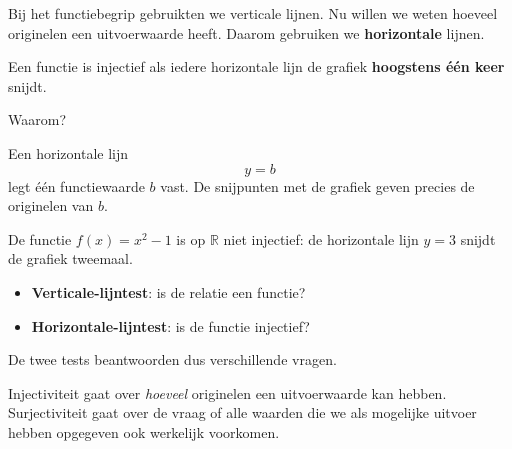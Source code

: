 \documentclass{ximera}
\begin{document}

Bij het functiebegrip gebruikten we verticale lijnen. Nu willen we weten
hoeveel originelen een uitvoerwaarde heeft. Daarom gebruiken we
\textbf{horizontale} lijnen.

\begin{eigenschap}
Een functie is injectief als iedere horizontale lijn de grafiek
\textbf{hoogstens één keer} snijdt.
\end{eigenschap}

Waarom?

Een horizontale lijn
\[
y=b
\]
legt één functiewaarde \(b\) vast. De snijpunten met de grafiek geven precies
de originelen van \(b\).

\begin{center}
\end{center}

De functie \(f(x)=x^2-1\) is op \(\mathbb R\) niet injectief:
de horizontale lijn \(y=3\) snijdt de grafiek tweemaal.

\begin{opmerking}
\begin{itemize}
    \item \textbf{Verticale-lijntest}: is de relatie een functie?
    \item \textbf{Horizontale-lijntest}: is de functie injectief?
\end{itemize}

De twee tests beantwoorden dus verschillende vragen.
\end{opmerking}



Injectiviteit gaat over \emph{hoeveel} originelen een uitvoerwaarde kan hebben.
Surjectiviteit gaat over de vraag of alle waarden die we als mogelijke uitvoer
hebben opgegeven ook werkelijk voorkomen.
\end{document}
